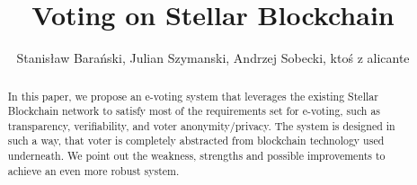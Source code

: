 \documentclass[runningheads]{llncs}
\begin{document}
%
\title{Voting on Stellar Blockchain}
%
%
\author{Stanisław Barański, Julian Szymanski, Andrzej Sobecki, ktoś z alicante}

%
%
\maketitle              %
%
\begin{abstract}
In this paper, we propose an e-voting system that leverages the existing Stellar Blockchain network to satisfy most of the requirements set for e-voting, such as transparency, verifiability, and voter anonymity/privacy. The system is designed in such a way, that voter is completely abstracted from blockchain technology used underneath. We point out the weakness, strengths and possible improvements to achieve an even more robust system. 


\end{abstract}
\end{document}
